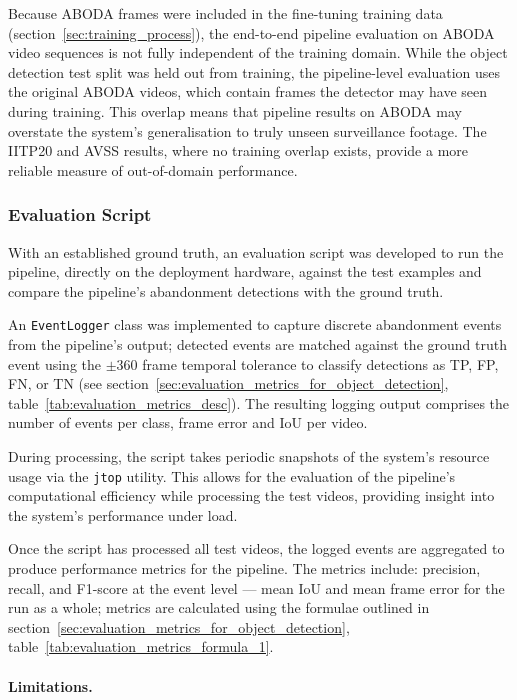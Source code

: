 Because ABODA frames were included in the fine-tuning training data
(section~\ref{sec:training_process}), the end-to-end pipeline evaluation on
ABODA video sequences is not fully independent of the training domain. While
the object detection test split was held out from training, the pipeline-level
evaluation uses the original ABODA videos, which contain frames the detector
may have seen during training. This overlap means that pipeline results on
ABODA may overstate the system's generalisation to truly unseen surveillance
footage. The IITP20 and AVSS results, where no training overlap exists, provide
a more reliable measure of out-of-domain performance.

\subsubsection{Evaluation Script}

With an established ground truth, an evaluation script was developed to run the
pipeline, directly on the deployment hardware, against the test examples and
compare the pipeline's abandonment detections with the ground truth.

An \texttt{EventLogger} class was implemented to capture discrete abandonment
events from the pipeline's output; detected events are matched against the
ground truth event using the $\pm 360$ frame temporal tolerance to classify
detections as TP, FP, FN, or TN (see
section~\ref{sec:evaluation_metrics_for_object_detection},
table~\ref{tab:evaluation_metrics_desc}). The resulting logging output
comprises the number of events per class, frame error and IoU per video.

During processing, the script takes periodic snapshots of the system's resource
usage via the \texttt{jtop} utility. This allows for the evaluation of the
pipeline's computational efficiency while processing the test videos, providing
insight into the system's performance under load.

Once the script has processed all test videos, the logged events are aggregated
to produce performance metrics for the pipeline. The metrics include:
precision, recall, and F1-score at the event level --- mean IoU and mean frame
error for the run as a whole; metrics are calculated using the formulae
outlined in section~\ref{sec:evaluation_metrics_for_object_detection},
table~\ref{tab:evaluation_metrics_formula_1}.

\paragraph{Limitations.}

